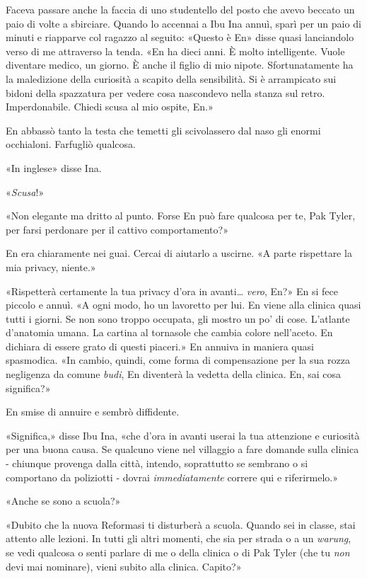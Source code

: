 Faceva passare anche la faccia di uno studentello del posto che avevo
beccato un paio di volte a sbirciare. Quando lo accennai a Ibu Ina
annuì, sparì per un paio di minuti e riapparve col ragazzo al seguito:
«Questo è En» disse quasi lanciandolo verso di me attraverso la tenda.
«En ha dieci anni. È molto intelligente. Vuole diventare medico, un
giorno. È anche il figlio di mio nipote. Sfortunatamente ha la
maledizione della curiosità a scapito della sensibilità. Si è
arrampicato sui bidoni della spazzatura per vedere cosa nascondevo nella
stanza sul retro. Imperdonabile. Chiedi scusa al mio ospite, En.»

En abbassò tanto la testa che temetti gli scivolassero dal naso gli
enormi occhialoni. Farfugliò qualcosa.

«In inglese» disse Ina.

«\emph{Scusa}!»

«Non elegante ma dritto al punto. Forse En può fare qualcosa per te, Pak
Tyler, per farsi perdonare per il cattivo comportamento?»

En era chiaramente nei guai. Cercai di aiutarlo a uscirne. «A parte
rispettare la mia privacy, niente.»

«Rispetterà certamente la tua privacy d'ora in avanti\ldots{}
\emph{vero}, En?» En si fece piccolo e annuì. «A ogni modo, ho un
lavoretto per lui. En viene alla clinica quasi tutti i giorni. Se non
sono troppo occupata, gli mostro un po' di cose. L'atlante d'anatomia
umana. La cartina al tornasole che cambia colore nell'aceto. En dichiara
di essere grato di questi piaceri.» En annuiva in maniera quasi
spasmodica. «In cambio, quindi, come forma di compensazione per la sua
rozza negligenza da comune \emph{budi}, En diventerà la vedetta della
clinica. En, sai cosa significa?»

En smise di annuire e sembrò diffidente.

«Significa,» disse Ibu Ina, «che d'ora in avanti userai la tua
attenzione e curiosità per una buona causa. Se qualcuno viene nel
villaggio a fare domande sulla clinica - chiunque provenga dalla città,
intendo, soprattutto se sembrano o si comportano da poliziotti - dovrai
\emph{immediatamente} correre qui e riferirmelo.»

«Anche se sono a scuola?»

«Dubito che la nuova Reformasi ti disturberà a scuola. Quando sei in
classe, stai attento alle lezioni. In tutti gli altri momenti, che sia
per strada o a un \emph{warung}, se vedi qualcosa o senti parlare di me
o della clinica o di Pak Tyler (che tu \emph{non} devi mai nominare),
vieni subito alla clinica. Capito?»

